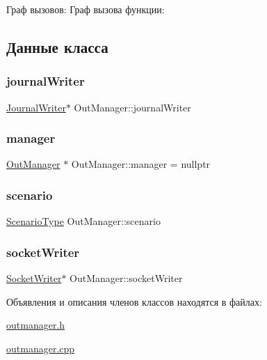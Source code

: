 Граф вызовов\+:
Граф вызова функции\+:


\subsection{Данные класса}
\mbox{\label{class_out_manager_a06df9af523b794582b5acb28906c811c}} 
\subsubsection{\texorpdfstring{journal\+Writer}{journalWriter}}
{\footnotesize\ttfamily \hyperlink{class_journal_writer}{Journal\+Writer}$\ast$ Out\+Manager\+::journal\+Writer}

\mbox{\label{class_out_manager_a1b90e2e00620117028b2a14499b80f43}} 
\subsubsection{\texorpdfstring{manager}{manager}}
{\footnotesize\ttfamily \hyperlink{class_out_manager}{Out\+Manager} $\ast$ Out\+Manager\+::manager = nullptr\hspace{0.3cm}{\ttfamily [static]}}

\mbox{\label{class_out_manager_ae9c258658580c48791cff6e5c3ad62af}} 
\subsubsection{\texorpdfstring{scenario}{scenario}}
{\footnotesize\ttfamily \hyperlink{_random_types_8h_ae8f073eec97d33cf9783ecbe50531dfd}{Scenario\+Type} Out\+Manager\+::scenario}

\mbox{\label{class_out_manager_ad278fd7fd56625176399bedfee84a4bc}} 
\subsubsection{\texorpdfstring{socket\+Writer}{socketWriter}}
{\footnotesize\ttfamily \hyperlink{class_socket_writer}{Socket\+Writer}$\ast$ Out\+Manager\+::socket\+Writer}



Объявления и описания членов классов находятся в файлах\+:\begin{DoxyCompactItemize}
\item 
\hyperlink{outmanager_8h}{outmanager.\+h}\item 
\hyperlink{outmanager_8cpp}{outmanager.\+cpp}\end{DoxyCompactItemize}
